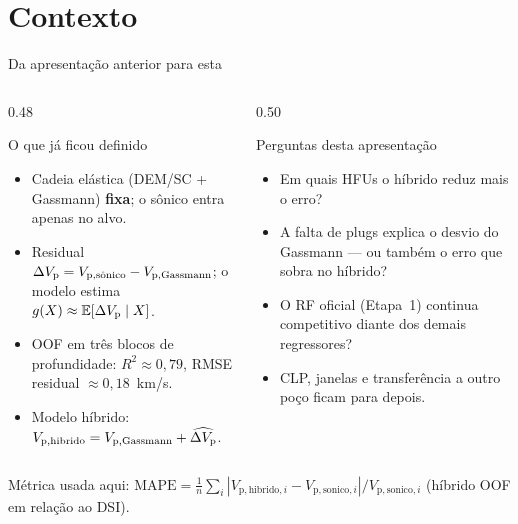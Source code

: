 \documentclass[aspectratio=169,10pt]{beamer}
\begin{document}
\section{Contexto}

\begin{frame}{Da apresentação anterior para esta}
  \footnotesize
  \begin{columns}[T,onlytextwidth]
    \begin{column}{0.48\textwidth}
      \begin{block}{O que já ficou definido}
        \scriptsize
        \begin{itemize}\setlength{\itemsep}{0.14em}
          \item Cadeia elástica (DEM/SC + Gassmann) \textbf{fixa};
                o sônico entra apenas no alvo.
          \item Residual
                $\dVp=\Vpsonsub-V_{\mathrm{p,Gassmann}}$;
                o modelo estima
                $g(X)\approx\mathbb{E}[\dVp\mid X]$.
          \item OOF em três blocos de profundidade:
                $R^2\approx 0{,}79$,
                RMSE residual $\approx 0{,}18$~km/s.
          \item Modelo híbrido:
                $V_{\mathrm{p,hibrido}}
                =V_{\mathrm{p,Gassmann}}+\widehat{\dVp}$.
        \end{itemize}
      \end{block}
    \end{column}
    \begin{column}{0.50\textwidth}
      \begin{exampleblock}{Perguntas desta apresentação}
        \scriptsize
        \begin{itemize}\setlength{\itemsep}{0.14em}
          \item Em quais HFUs o híbrido reduz mais o erro?
          \item A falta de plugs explica o desvio do Gassmann
                --- ou também o erro que sobra no híbrido?
          \item O RF oficial (Etapa~1) continua competitivo
                diante dos demais regressores?
          \item CLP, janelas e transferência a outro poço
                ficam para depois.
        \end{itemize}
      \end{exampleblock}
    \end{column}
  \end{columns}
  \vspace{0.10cm}
  {\scriptsize
  Métrica usada aqui:
  $\mathrm{MAPE}
  =\frac{1}{n}\sum_i
  |V_{\mathrm{p,hibrido},i}-V_{\mathrm{p,sonico},i}|
  /V_{\mathrm{p,sonico},i}$
  (híbrido OOF em relação ao DSI).}
\end{frame}
\end{document}
